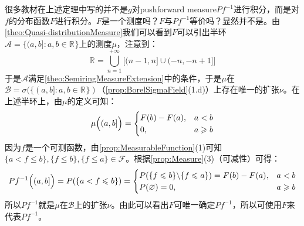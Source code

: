 \begin{note}
	很多教材在上述定理中写的并不是$g$对pushforward measure$Pf^{-1}$进行积分，而是对$f$的分布函数$F$进行积分。$F$是一个测度吗？$F$与$Pf^{-1}$等价吗？显然并不是。由\cref{theo:Quasi-distributionMeasure}我们可以看到$F$可以引出半环$\mathscr{A}=\{(a,b]:a,b\in\mathbb{R}^{}\}$上的测度$\mu$，注意到：
	\begin{equation*}
		\mathbb{R}^{}=\underset{n=1}{\overset{+\infty}{\bigcup}}\Big[(n-1,n]\cup(-n,-n+1]\Big]
	\end{equation*}
	于是$\mathscr{A}$满足\cref{theo:SemiringMeasureExtension}中的条件，于是$\mu$在$\mathcal{B}=\sigma(\{(a,b]:a,b\in\mathbb{R}^{}\})$（\cref{prop:BorelSigmaField}(1.d)）上存在唯一的扩张$\nu$。在上述半环上，由$\mu$的定义可知：
	\begin{equation*}
		\mu\Bigl((a,b]\Bigr)=
		\begin{cases}
			F(b)-F(a),&a<b \\
			0,&a\geqslant b
		\end{cases}
	\end{equation*}
	因为$f$是一个可测函数，由\cref{prop:MeasurableFunction}(1)可知$\{a<f\leqslant b\},\{f\leqslant b\},\{f\leqslant a\}\in\mathscr{F}$。根据\cref{prop:Measure}(3)（可减性）可得：
	\begin{equation*}
		Pf^{-1}\Bigl((a,b]\Bigr)=P(\{a<f\leqslant b\})=
		\begin{cases}
			P(\{f\leqslant b\}\backslash\{f\leqslant a\})=F(b)-F(a),&a<b \\
			P(\varnothing)=0,&a\geqslant b
		\end{cases}
	\end{equation*}
	所以$Pf^{-1}$就是$\mu$在$\mathcal{B}$上的扩张$\nu$。由此可以看出$F$可唯一确定$Pf^{-1}$，所以可使用$F$来代表$Pf^{-1}$。
\end{note}

